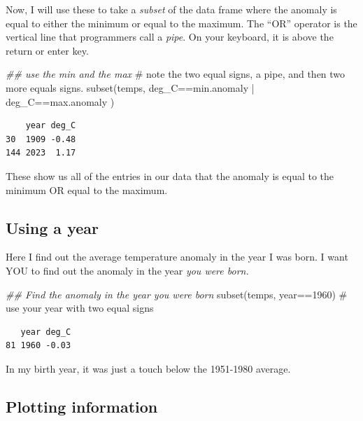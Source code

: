 \documentclass[
  letterpaper,
  DIV=11,
  numbers=noendperiod]{scrreprt}
\newenvironment{Shaded}{\begin{snugshade}}{\end{snugshade}}
\newcommand{\CommentTok}[1]{\textcolor[rgb]{0.37,0.37,0.37}{#1}}
\newcommand{\DecValTok}[1]{\textcolor[rgb]{0.68,0.00,0.00}{#1}}
\newcommand{\DocumentationTok}[1]{\textcolor[rgb]{0.37,0.37,0.37}{\textit{#1}}}
\newcommand{\FunctionTok}[1]{\textcolor[rgb]{0.28,0.35,0.67}{#1}}
\newcommand{\NormalTok}[1]{\textcolor[rgb]{0.00,0.23,0.31}{#1}}
\newcommand{\SpecialCharTok}[1]{\textcolor[rgb]{0.37,0.37,0.37}{#1}}
\begin{document}
Now, I will use these to take a \emph{subset} of the data frame where
the anomaly is equal to either the minimum or equal to the maximum. The
``OR'' operator is the vertical line that programmers call a
\emph{pipe}. On your keyboard, it is above the return or enter key.

\begin{Shaded}
\begin{Highlighting}[]
\DocumentationTok{\#\# use the min and the max}
\CommentTok{\# note the two equal signs, a pipe, and then two more equals signs.}
\FunctionTok{subset}\NormalTok{(temps, deg\_C}\SpecialCharTok{==}\NormalTok{min.anomaly }\SpecialCharTok{|}\NormalTok{ deg\_C}\SpecialCharTok{==}\NormalTok{max.anomaly ) }
\end{Highlighting}
\end{Shaded}

\begin{verbatim}
    year deg_C
30  1909 -0.48
144 2023  1.17
\end{verbatim}

These show us all of the entries in our data that the anomaly is equal
to the minimum OR equal to the maximum.

\subsection{Using a year}\label{using-a-year}

Here I find out the average temperature anomaly in the year I was born.
I want YOU to find out the anomaly in the year \emph{you were born.}

\begin{Shaded}
\begin{Highlighting}[]
\DocumentationTok{\#\# Find the anomaly in the year you were born}
\FunctionTok{subset}\NormalTok{(temps, year}\SpecialCharTok{==}\DecValTok{1960}\NormalTok{) }\CommentTok{\# use your year with two equal signs}
\end{Highlighting}
\end{Shaded}

\begin{verbatim}
   year deg_C
81 1960 -0.03
\end{verbatim}

In my birth year, it was just a touch below the 1951-1980 average.

\subsection{Plotting information}\label{plotting-information}
\end{document}
